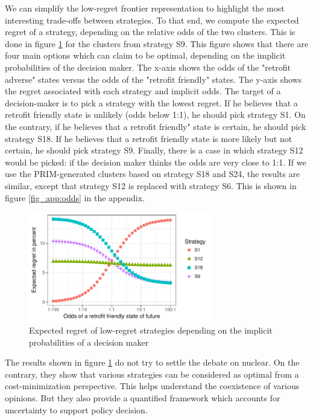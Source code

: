 We can simplify the low-regret frontier representation to highlight the most interesting trade-offs between strategies. To that end, we compute the expected regret of a strategy, depending on the relative odds of the two clusters. This is done in figure \ref{fig:odds_S9} for the clusters from strategy S9. This figure shows that there are four main options which can claim to be optimal, depending on the implicit probabilities of the decision maker. 
The x-axis shows the odds of the "retrofit adverse" states versus the odds of the "retrofit friendly" states. 
The y-axis shows the regret associated with each strategy and implicit odds. 
The target of a decision-maker is to pick a strategy with the lowest regret. 
If he believes that a retrofit friendly state is unlikely (odds below 1:1), he should pick strategy S1. 
On the contrary, if he believes that a retrofit friendly" state is certain, he should pick strategy S18.
If he believes that a retrofit friendly state is more likely but not certain, he should pick strategy S9.
Finally, there is a case in which strategy S12 would be picked: if the decision maker thinks the odds are very close to 1:1.
If we use the PRIM-generated clusters based on strategy S18 and S24, the results are similar, except that strategy S12 is replaced with strategy S6. This is shown in figure \ref{fig_app:odds} in the appendix.


\begin{figure}[!ht]
	\centering
	\includegraphics[width=8cm]{figures/odds_S9.pdf}
	\caption{Expected regret of low-regret strategies depending on the implicit probabilities of a decision maker}
	\label{fig:odds_S9}
\end{figure}

The results shown in figure \ref{fig:odds_S9} do not try to settle the debate on nuclear. On the contrary, they show that various strategies can be considered as optimal from a cost-minimization perspective. This helps understand the coexistence of various opinions. But they also provide a quantified framework which accounts for uncertainty to support policy decision. 

